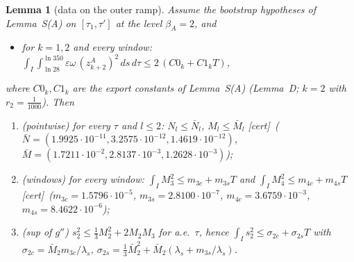 \documentclass[11pt]{article}
\newtheorem{lemma}{Lemma}\newtheorem{proposition}{Proposition}\newtheorem{remark}{Remark}\newtheorem{definition}{Definition}
\newcommand{\tC}{\textup{[cert]}}\newcommand{\tHd}{\textup{[hand]}}\newcommand{\tE}{\textup{[est]}}\newcommand{\tS}{\textup{[sym]}}
\begin{document}
\begin{lemma}[data on the outer ramp]\label{F:lem:data}
Assume the bootstrap hypotheses of Lemma~S(A) on $[\tau_1,\tau']$ at the level $\beta_A=2$, and
\begin{itemize}[leftmargin=3.2em]
\item[\textup{(B$\Phi$)}] for $k=1,2$ and every window: $\displaystyle\int_I\!\int_{\ln28}^{\ln350}\varepsilon\omega\,(z^A_{k+2})^2\,ds\,d\tau\le2\,(C0_k+C1_kT)$,
\end{itemize}
where $C0_k,C1_k$ are the export constants of Lemma~S(A) (Lemma~D; $k=2$ with $r_2=\frac1{1000}$). Then
\begin{enumerate}[label=(\alph*)]
\item \emph{(pointwise)} for every $\tau$ and $l\le2$: $N_l\le\bar N_l$, $M_l\le\bar M_l$ \tC\ ($\bar N=(1.9925\cdot10^{-11}, 3.2575\cdot10^{-12}, 1.4619\cdot10^{-12})$, $\bar M=(1.7211\cdot10^{-2}, 2.8137\cdot10^{-3}, 1.2628\cdot10^{-3})$);
\item \emph{(windows)} for every window: $\int_IM_3^2\le m_{3c}+m_{3s}T$ and $\int_IM_4^2\le m_{4c}+m_{4s}T$ \tC\ ($m_{3c}=1.5796\cdot10^{-5}$, $m_{3s}=2.8100\cdot10^{-7}$, $m_{4c}=3.6759\cdot10^{-3}$, $m_{4s}=8.4622\cdot10^{-6}$);
\item \emph{(sup of $g''$)} $s_2^2\le\frac13M_2^2+2M_2M_3$ for a.e.\ $\tau$, hence $\int_Is_2^2\le\sigma_{2c}+\sigma_{2s}T$ with $\sigma_{2c}=\bar M_2m_{3c}/\lambda_s$, $\sigma_{2s}=\frac13\bar M_2^2+\bar M_2(\lambda_s+m_{3s}/\lambda_s)$.
\end{enumerate}
\end{lemma}
\end{document}
